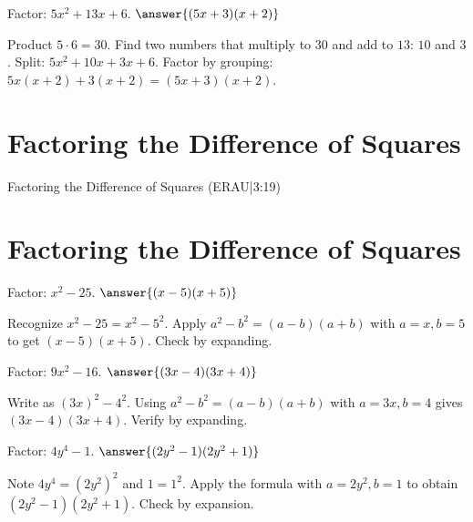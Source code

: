 \documentclass{ximera}
\begin{document}
\begin{problem}
Factor: \(5x^2 + 13x + 6\). $\answer{(5x+3)(x+2)}$
\begin{feedback}
Product \(5\cdot6=30\). Find two numbers that multiply to \(30\) and add to \(13\): \(10\) and \(3\). Split: \(5x^2+10x+3x+6\). Factor by grouping: \(5x(x+2)+3(x+2)=(5x+3)(x+2)\).
\end{feedback}
\end{problem}


\section*{Factoring the Difference of Squares}

Factoring the Difference of Squares (ERAU|3:19)



\section*{Factoring the Difference of Squares}

\begin{problem}
Factor: \(x^2 - 25\). $\answer{(x-5)(x+5)}$
\begin{feedback}
Recognize \(x^2-25 = x^2-5^2\). Apply \(a^2-b^2=(a-b)(a+b)\) with \(a=x,b=5\) to get \((x-5)(x+5)\). Check by expanding.
\end{feedback}
\end{problem}

\begin{problem}
Factor: \(9x^2 - 16\). $\answer{(3x-4)(3x+4)}$
\begin{feedback}
Write as \((3x)^2-4^2\). Using \(a^2-b^2=(a-b)(a+b)\) with \(a=3x,b=4\) gives \((3x-4)(3x+4)\). Verify by expanding.
\end{feedback}
\end{problem}

\begin{problem}
Factor: \(4y^4 - 1\). $\answer{(2y^2-1)(2y^2+1)}$
\begin{feedback}
Note \(4y^4=(2y^2)^2\) and \(1=1^2\). Apply the formula with \(a=2y^2,b=1\) to obtain \((2y^2-1)(2y^2+1)\). Check by expansion.
\end{feedback}
\end{problem}

\end{document}
